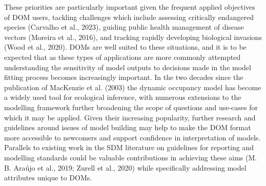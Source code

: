 \documentclass[
]{article}
\begin{document}
These priorities are particularly important given the frequent applied
objectives of DOM users, tackling challenges which include assessing
critically endangered species (Carvalho et al., 2023), guiding public
health management of disease vectors (Moreira et al., 2016), and
tracking rapidly developing biological invasions (Wood et al., 2020).
DOMs are well suited to these situations, and it is to be expected that
as these types of applications are more commonly attempted understanding
the sensitivity of model outputs to decisions made in the model fitting
process becomes increasingly important. In the two decades since the
publication of MacKenzie et al. (2003) the dynamic occupancy model has
become a widely used tool for ecological inference, with numerous
extensions to the modelling framework further broadening the scope of
questions and use-cases for which it may be applied. Given their
increasing popularity, further research and guidelines around issues of
model building may help to make the DOM format more accessible to
newcomers and support confidence in interpretation of models. Parallels
to existing work in the SDM literature on guidelines for reporting and
modelling standards could be valuable contributions in achieving these
aims (M. B. Araújo et al., 2019; Zurell et al., 2020) while specifically
addressing model attributes unique to DOMs.
\end{document}
